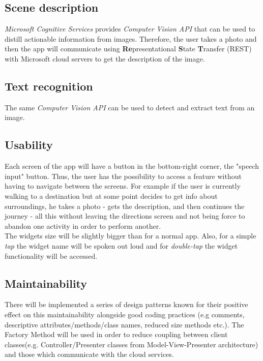 \documentclass{article}[11]
\begin{document}
\subsection{Scene description}
	\emph{Microsoft Cognitive Services} provides \emph{Computer Vision API} that can be used to distill actionable information from images. Therefore, the user takes a photo and then the app will communicate using \textbf{Re}presentational \textbf{S}tate \textbf{T}ransfer (REST) with Microsoft cloud servers to get the description of the image.
	
\subsection{Text recognition}
	The same \emph{Computer Vision API} can be used to detect and extract text from an image.
	
\subsection{Usability}
	Each screen of the app will have a button in the bottom-right corner, the "speech input" button. Thus, the user has the possibility to access a feature without having to navigate between the screens. For example if the user is currently walking to a destination but at some point decides to get info about surroundings, he takes a photo - gets the description, and then continues the journey - all this without leaving the directions screen and not being force to abandon one activity in order to perform another.\\
	
	The widgets size will be slightly bigger than for a normal app. Also, for a simple \emph{tap} the widget name will be spoken out loud and for \emph{double-tap} the widget functionality will be accessed.

\subsection{Maintainability}
	There will be implemented a series of design patterns known for their  positive effect on this maintainability alongside good coding practices (e.g comments, descriptive attributes/methods/class names, reduced size methods etc.). The Factory Method will be used in order to reduce coupling between client classes(e.g. Controller/Presenter classes from Model-View-Presenter architecture) and those which communicate with the cloud services. \\
	
\end{document}
